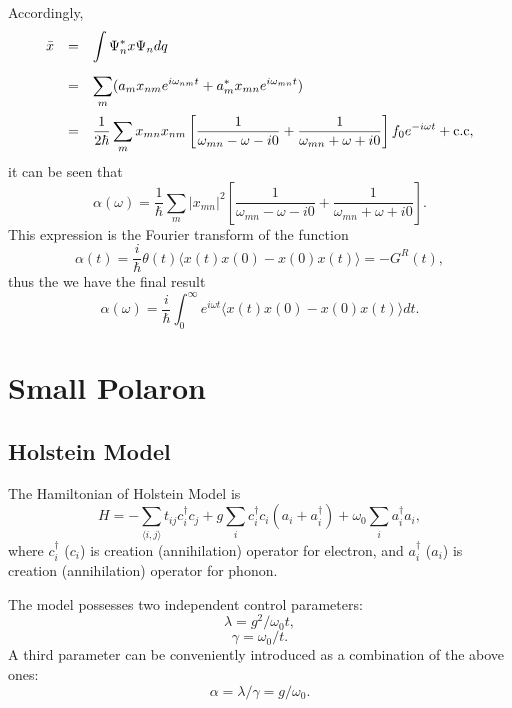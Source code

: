 \documentclass{book}
\newcommand{\average}[1]{\langle#1\rangle}
\numberwithin{equation}{section}
\begin{document}
Accordingly,
\begin{equation}
  \begin{array}{rcl}
    \bar{x}&=&\displaystyle\int \Psi_n^*x\Psi_ndq\\\vbox to 20pt{}
    &=&\displaystyle\sum_m(a_mx_{nm}e^{i\omega_{nm}t}+
    a^*_{m}x_{mn}e^{i\omega_{mn}t})\\\vbox to 20pt{}
    &=&\displaystyle\frac{1}{2\hbar}\sum_mx_{mn}x_{nm}\left[
      \frac{1}{\omega_{mn}-\omega-i0}+\frac{1}{\omega_{mn}+\omega+i0}
      \right]f_0e^{-i\omega t}+\hbox{c.c},
  \end{array}
\end{equation}
it can be seen that
\begin{equation}
  \alpha(\omega)=\frac{1}{\hbar}\sum_m|x_{mn}|^2\left[
  \frac{1}{\omega_{mn}-\omega-i0}+\frac{1}{\omega_{mn}+\omega+i0}
      \right].
\end{equation}
This expression is the Fourier transform of the function
\begin{equation}
  \alpha(t)=\frac{i}{\hbar}\theta(t)\average{x(t)x(0)-x(0)x(t)}=-G^R(t),
\end{equation}
thus the we have the final result
\begin{equation}
  \alpha(\omega)=\frac{i}{\hbar}\int_0^\infty e^{i\omega t}
  \average{x(t)x(0)-x(0)x(t)}dt.
\end{equation}
\chapter{Small Polaron}
\section{Holstein Model}
The Hamiltonian of Holstein Model is
\begin{equation}
  H=-\sum_{\langle{i,j}\rangle}t_{ij}c_i^\dag c_j+g\sum_ic_i^\dag c_i(a_i+a_i^\dag)
  +\omega_0\sum_ia_i^\dag a_i,
  \label{Holstein}
\end{equation}
where $c_i^\dag$ ($c_i$) is creation (annihilation) operator for electron, and
$a_i^\dag$ ($a_i$) is creation (annihilation) operator for phonon.

The model possesses two independent control parameters:
\begin{equation}
  \lambda =g^2/\omega_0t,
\end{equation}
\begin{equation}
  \gamma=\omega_0/t.
\end{equation}
A third parameter can be conveniently introduced as a combination of
the above ones:
\begin{equation}
  \alpha=\lambda/\gamma=g/\omega_0.
\end{equation}
\end{document}
